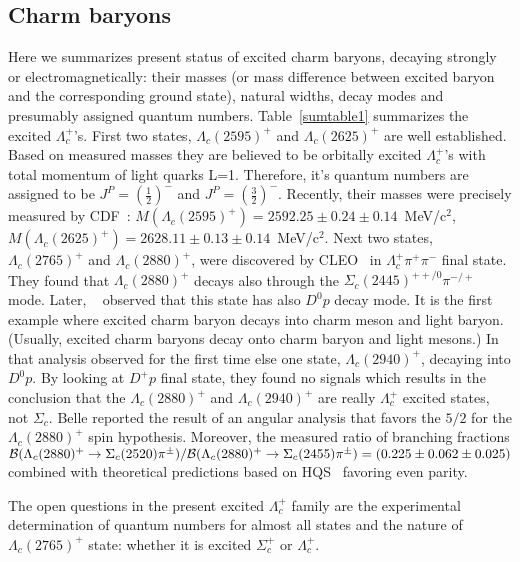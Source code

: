 \subsection{Charm baryons}


Here we summarizes present status of excited charm baryons, 
decaying strongly or electromagnetically: their masses (or 
mass difference between excited baryon and the corresponding 
ground state), natural widths, decay modes and presumably 
assigned quantum numbers. 
Table~\ref{sumtable1} summarizes the excited $\Lambda_c^+$'s.  
First two states, $\Lambda_c(2595)^+$ and $\Lambda_c(2625)^+$ 
are well established. 
Based on measured masses they are believed to be orbitally 
excited $\Lambda_c^+$'s with total momentum of light quarks 
L=1. Therefore, it's quantum numbers are assigned to be 
$J^P=(\frac{1}{2})^-$ and $J^P=(\frac{3}{2})^-$. Recently, 
their masses 
were precisely measured by CDF~\cite{Aaltonen:2011sf}: 
$M(\Lambda_c(2595)^+)=2592.25\pm 0.24\pm 0.14$~MeV/c$^2$, 
$M(\Lambda_c(2625)^+)=2628.11\pm 0.13\pm 0.14$~MeV/c$^2$. 
Next two states, $\Lambda_c(2765)^+$ and $\Lambda_c(2880)^+$, 
were discovered by CLEO~\cite{Artuso:2000xy} in $\Lambda_c^+\pi^+\pi^-$ 
final state. 
They found that $\Lambda_c(2880)^+$ decays also through the 
$\Sigma_c(2445)^{++/0}\pi^{-/+}$ mode. 
Later, \babar~\cite{Aubert:2006sp} 
observed that this state has also $D^0 p$ decay mode. It is the 
first example where excited charm baryon decays into charm meson 
and light baryon. (Usually, excited charm baryons decay onto charm 
baryon and light mesons.) In that analysis \babar 
observed for the first time else one state, $\Lambda_c(2940)^+$, 
decaying into $D^0 p$. By looking at $D^+ p$ final state, they found 
no signals which results in the conclusion that the $\Lambda_c(2880)^+$ 
and $\Lambda_c(2940)^+$ are really 
$\Lambda_c^+$ excited states, not $\Sigma_c$. 
Belle reported the result of an angular analysis that favors the $5/2$ 
for the $\Lambda_c(2880)^+$ spin hypothesis. 
Moreover, the measured ratio of branching fractions 
${\cal B}(\Lambda_c(2880)^+\rightarrow \Sigma_c(2520)\pi^{\pm})/{\cal B}(\Lambda_c(2880)^+\rightarrow \Sigma_c(2455)\pi^{\pm})=(0.225\pm 0.062\pm 0.025)$ combined 
with theoretical predictions based on HQS~\cite{Isgur:1991wq,Cheng:2006dk} 
favoring even parity.     

The open questions in the present excited $\Lambda_c^+$ family are the 
experimental determination of quantum numbers for almost all states and 
the nature of $\Lambda_c(2765)^+$ state: whether it is excited $\Sigma_c^+$ 
or $\Lambda_c^+$.

